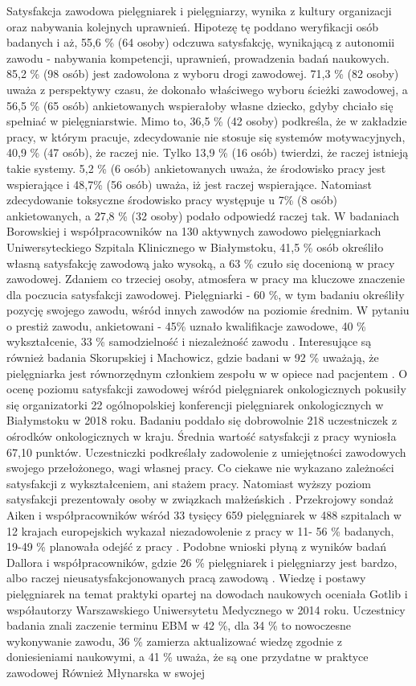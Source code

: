 \documentclass[a4paper,12pt,twoside,openany]{report}
\begin{document}
Satysfakcja zawodowa pielęgniarek i pielęgniarzy, wynika z kultury organizacji oraz nabywania kolejnych uprawnień. Hipotezę tę poddano weryfikacji osób badanych i aż, 55,6 \%  (64 osoby) odczuwa satysfakcję, wynikającą z autonomii zawodu - nabywania kompetencji, uprawnień, prowadzenia badań naukowych.   85,2 \% (98 osób) jest zadowolona z wyboru drogi zawodowej. 71,3 \% (82 osoby) uważa z perspektywy czasu, że dokonało właściwego wyboru ścieżki zawodowej, a 56,5 \% (65 osób) ankietowanych wspierałoby własne dziecko, gdyby chciało się spełniać w pielęgniarstwie. Mimo to,  36,5 \% (42 osoby) podkreśla, że w zakładzie pracy, w którym pracuje,   zdecydowanie nie stosuje się systemów motywacyjnych, 40,9 \% (47 osób), że raczej nie. Tylko 13,9 \% (16 osób) twierdzi, że raczej istnieją takie systemy. 5,2 \% (6 osób) ankietowanych uważa, że środowisko pracy jest wspierające i 48,7\%  (56 osób)  uważa, iż jest raczej wspierające. Natomiast zdecydowanie toksyczne środowisko pracy występuje u 7\% (8 osób) ankietowanych, a 27,8 \%  (32 osoby) podało odpowiedź raczej tak. W badaniach  Borowskiej i współpracowników na 130 aktywnych zawodowo pielęgniarkach Uniwersyteckiego Szpitala Klinicznego w Białymstoku, 41,5 \% osób określiło własną satysfakcję zawodową jako wysoką, a 63 \% czuło się docenioną w pracy zawodowej. Zdaniem co trzeciej osoby, atmosfera w pracy ma kluczowe znaczenie dla poczucia satysfakcji zawodowej. Pielęgniarki - 60 \%, w tym badaniu określiły  pozycję swojego zawodu, wśród innych zawodów na poziomie średnim. W pytaniu o prestiż zawodu, ankietowani - 45\% uznało kwalifikacje zawodowe, 40 \% wykształcenie, 33 \% samodzielność i niezależność zawodu \cite{zbiorowa}. Interesujące są również badania Skorupskiej  i Machowicz, gdzie badani w 92 \% uważają, że pielęgniarka jest równorzędnym członkiem zespołu w w opiece nad pacjentem \cite{skorupska}. O ocenę poziomu satysfakcji zawodowej wśród pielęgniarek onkologicznych pokusiły się organizatorki 22 ogólnopolskiej konferencji pielęgniarek onkologicznych w Białymstoku w 2018 roku. Badaniu poddało się dobrowolnie 218 uczestniczek z ośrodków onkologicznych w kraju. Średnia wartość satysfakcji z pracy wyniosła 67,10 punktów. Uczestniczki podkreślały zadowolenie z umiejętności zawodowych swojego przełożonego, wagi własnej pracy. Co ciekawe nie wykazano zależności satysfakcji z wykształceniem, ani stażem pracy. Natomiast wyższy poziom satysfakcji prezentowały osoby w związkach małżeńskich \cite{onkologiczne}. Przekrojowy sondaż Aiken i współpracowników wśród  33 tysięcy 659 pielęgniarek w 488 szpitalach w 12 krajach europejskich wykazał niezadowolenie z pracy  w 11- 56 \% badanych, 19-49 \% planowała odejść z pracy \cite{termedia}. Podobne wnioski płyną z wyników badań Dallora  i współpracowników, gdzie 26 \% pielęgniarek i pielęgniarzy jest bardzo, albo raczej nieusatysfakcjonowanych pracą zawodową \cite{dalora}. Wiedzę i postawy pielęgniarek na temat praktyki opartej na dowodach naukowych oceniała Gotlib i współautorzy Warszawskiego Uniwersytetu Medycznego w 2014 roku. Uczestnicy badania znali zaczenie terminu EBM w 42 \%, dla 34 \% to nowoczesne wykonywanie zawodu, 36 \% zamierza aktualizować wiedzę zgodnie z doniesieniami naukowymi, a 41 \% uważa, że są one przydatne w praktyce zawodowej \cite{gotlib} Również Młynarska w swojej 
\end{document}
